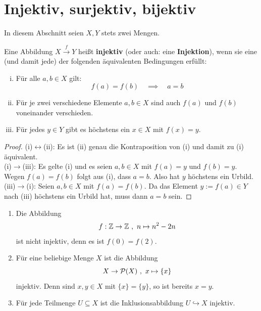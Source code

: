 \section{Injektiv, surjektiv, bijektiv}


In diesem Abschnitt seien $X,Y$ stets zwei Mengen.


\begin{defin} \label{def:injektiv} 
    Eine Abbildung $X \xrightarrow{f} Y$ heißt \textbf{injektiv} (oder auch: eine \textbf{Injektion}), wenn sie eine (und damit jede) der folgenden äquivalenten Bedingungen erfüllt:
    \begin{enumerate}[(i)]
        \item Für alle $a,b\in X$ gilt:
            \[ f(a)=f(b) \quad\implies\quad a=b \]
        \item Für je zwei verschiedene Elemente $a,b \in X$ sind auch $f(a)$ und $f(b)$ voneinander verschieden.
        \item Für jedes $y\in Y$ gibt es höchstens ein $x\in X$ mit $f(x)=y$.
    \end{enumerate}
\end{defin}
\begin{proof}
    (i)$\leftrightarrow$(ii): Es ist (ii) genau die Kontraposition von (i) und damit zu (i) äquivalent. \\[0.5em]
    (i)$\rightarrow$(iii): Es gelte (i) und es seien $a,b\in X$ mit $f(a)=y$ und $f(b)=y$. Wegen $f(a)=f(b)$ folgt aus (i), dass $a=b$. Also hat $y$ höchstens ein Urbild. \\[0.5em]
    (iii)$\rightarrow$(i): Seien $a,b\in X$ mit $f(a)=f(b)$. Da das Element $y:=f(a)\in Y$ nach (iii) höchstens ein Urbild hat, muss dann $a=b$ sein.
\end{proof}


\begin{bsp} \quad
    \begin{enumerate}
        \item Die Abbildung
            \[ f:\mathbb Z \to \mathbb Z \ ,\ n \mapsto n^2-2n \]
        ist nicht injektiv, denn es ist $f(0)=f(2)$.
        \item Für eine beliebige Menge $X$ ist die Abbildung
            \[ X \to \mathcal P(X) \ ,\ x \mapsto \{x\} \]
        injektiv. Denn sind $x,y\in X$ mit $\{x\}=\{y\}$, so ist bereits $x=y$.
        \item Für jede Teilmenge $U\subseteq X$ ist die Inklusionsabbildung $U\hookrightarrow X$ injektiv.
    \end{enumerate}
\end{bsp}
	

